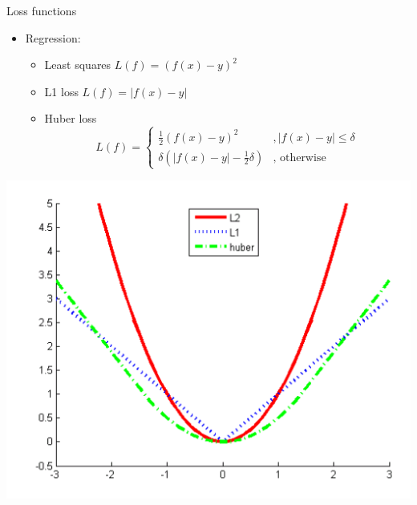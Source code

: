 \documentclass[12pt,notes,mathserif]{beamer}
\providecommand{\tightlist}{%
	\setlength{\itemsep}{0pt}\setlength{\parskip}{0pt}}
\begin{document}
\begin{frame}{Loss functions}

\begin{itemize}
\tightlist
\item
  Regression:

  \begin{itemize}
  \tightlist
  \item
    Least squares \(L(f)=(f(x)-y)^{2}\)
  \item
    L1 loss \(L(f)=|f(x)-y|\)
  \item
    Huber loss
    \[L({f})=\begin{cases} \frac{1}{2} (f(x)-y)^2 & , |f(x)-y| \le \delta \\ \delta (|f(x)-y| -\frac{1}{2} \delta ) & \textrm{, otherwise} \end{cases}\]
  \end{itemize}
\end{itemize}

\begin{center}
    \includegraphics[width=.37\textwidth]{2018-04-15-13-10-18.png}
\end{center}

\end{frame}
\end{document}
